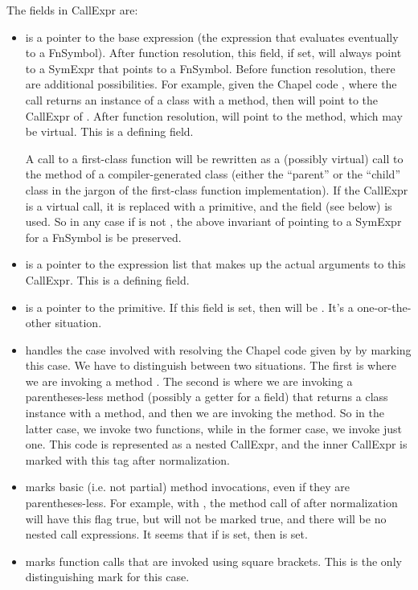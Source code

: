 \documentclass[10pt]{article}
\begin{document}
The fields in CallExpr are:
\begin{itemize}
\item {} is a pointer to the base expression (the
  expression that evaluates eventually to a FnSymbol).  After function
  resolution, this field, if set, will always point to a SymExpr that
  points to a FnSymbol.  Before function resolution, there are
  additional possibilities.  For example, given the Chapel code
  , where the call  returns an instance of a
  class with a  method, then  will point
  to the CallExpr of . After function resolution,
   will point to the  method, which may be virtual.
  This is a defining field.

  A call to a first-class function will be rewritten as a (possibly
  virtual) call to the  method of a compiler-generated
  class (either the ``parent'' or the ``child'' class in the jargon of
  the first-class function implementation).  If the CallExpr is a
  virtual call, it is replaced with a primitive, and the
   field (see below) is used.  So in any case if
   is not , the above invariant of pointing to a
  SymExpr for a FnSymbol is be preserved.
\item {} is a pointer to the expression list that
  makes up the actual arguments to this CallExpr.
  This is a defining field.
\item {} is a pointer to the primitive.  If
  this field is set, then  will be .  It's a
  one-or-the-other situation.
\item {} handles the case involved with resolving
  the Chapel code given by  by marking this case.  We have
  to distinguish between two situations.  The first is where we are invoking a
  method .  The second is where we are invoking a
  parentheses-less method (possibly a getter for a field) that returns
  a class instance with a  method, and then we are invoking
  the  method.  So in the latter case, we invoke two
  functions, while in the former case, we invoke just one.  This code
  is represented as a nested CallExpr, and the inner CallExpr is
  marked with this tag after normalization.
\item {} marks basic (i.e. not partial) method invocations, even if they
  are parentheses-less.  For example, with , the method call
  of  after normalization will have this flag true, but
   will not be marked true, and there will be no nested call
  expressions.  It seems that if  is set, then
   is set.
\item {} marks function calls that are invoked using
  square brackets.  This is the only distinguishing mark for this
  case.
\end{itemize}
\end{document}
